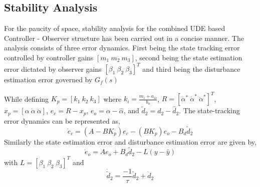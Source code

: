 \documentclass[conference]{IEEEtran}
\begin{document}
	\subsection{Stability Analysis}
		For the paucity of space, stability analysis for the combined UDE based Controller - Observer structure has been carried out in a concise manner. The analysis consists of three error dynamics. First being the state tracking error controlled by controller gains $[m_1~m_2~m_3]$, second being the state estimation error dictated by observer gains $[\beta_1\ \beta_2\ \beta_3]^T$ and third being the disturbance estimation error governed by $G_f(s)$ 
		
		While defining $K_p = [k_1\ k_2\ k_3]$ where $k_i = \frac{m_i + a_{io}}{b_o}$, $R = [\alpha^* \ \dot{\alpha}^* \ \ddot{\alpha}^*]^T$, $x_p = [\alpha \ \dot{\alpha} \ \ddot{\alpha}]$, $e_c = R - x_p$, $e_o = \alpha - \hat{\alpha}$, and $\tilde{d}_2 = d_2 - \hat{d}_2$. The state-tracking error dynamics can be represented as,
		\begin{equation}
			\dot{e}_c = (A - BK_p)e_c - (BK_p)e_o - B_d\tilde{d}_2 \label{e_con}
		\end{equation}
		Similarly the state estimation error and disturbance estimation error are given by,
		\begin{equation}
			\dot{e}_o = Ae_o + B_d\tilde{d}_2 - L(y - \hat{y}) \label{e_obs}
		\end{equation}
		with $L = [\beta_1 \ \beta_2 \ \beta_3]^T$ and 
		\begin{equation}
			\dot{\tilde{d}}_2 = \frac{-1}{\tau}\tilde{d}_2 + \dot{d}_2 \label{e_dist}
		\end{equation}
				
\end{document}
